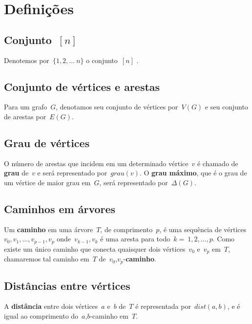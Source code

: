 \documentclass[a4paper,12pt]{article}
\begin{document}
\section{Definições}
	
	\subsection{Conjunto~$[n]$}
	Denotemos por~$\{1,2,\ldots~n\}$
	o conjunto~$[n]$ .

	\subsection{Conjunto de vértices e arestas}
	Para um grafo~$G$, denotamos seu
	conjunto de vértices por~$V(G)$ e seu
	conjunto de arestas por~$E(G)$.

	\subsection{Grau de vértices}
	O número de arestas que incidem em um determinado
	vértice~$v$ é chamado de 
	\textbf{grau} de~$v$ e será representado
	por~$grau(v)$. O 
	\textbf{grau máximo}, que é o grau de um vértice de
	maior grau em~$G$, será representado por~$\Delta(G)$.

	\subsection{Caminhos em árvores}
	Um \textbf{caminho} em uma árvore~$T$, de 
	comprimento~$p$, é uma sequência de 
	vértices~$v_0, v_1, \ldots,v_{p-1}, v_p$ 
	onde~$v_{k-1}, v_k$ é uma aresta para todo~$k =~1,2, \ldots, p$. 
	Como existe um único caminho que conecta quaisquer dois 
	vértices~$v_0$ e~$v_p$ em~$T$, chamaremos tal 
	caminho em~$T$ de~$v_0$,$v_p$-\textbf{caminho}.

	\subsection{Distâncias entre vértices}
	A \textbf{distância} entre dois vértices~$a$ e~$b$ 
	de~$T$ é representada por~$dist(a,b)$, 
	e é igual ao comprimento do~$a$,$b$-caminho em~$T$.

		

\newpage

\end{document}
